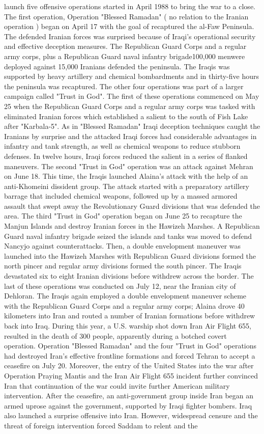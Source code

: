 \documentclass[12pt]{book}
\begin{document}
launch five offensive operations started in April 1988 to bring the war to a close. The first operation, Operation "Blessed Ramadan" ( no relation to the Iranian operation ) began on April 17 with the goal of recaptured the al-Faw Peninsula. The defended Iranian forces was surprised because of Iraqi's operational security and effective deception measures. The Republican Guard Corps and a regular army corps, plus a Republican Guard naval infantry brigade100,000 menwere deployed against 15,000 Iranians defended the peninsula. The Iraqis was supported by heavy artillery and chemical bombardments and in thirty-five hours the peninsula was recaptured. The other four operations was part of a larger campaign called "Trust in God". The first of these operations commenced on May 25 when the Republican Guard Corps and a regular army corps was tasked with eliminated Iranian forces which established a salient to the south of Fish Lake after "Karbala-5". As in "Blessed Ramadan" Iraqi deception techniques caught the Iranians by surprise and the attacked Iraqi forces had considerable advantages in infantry and tank strength, as well as chemical weapons to reduce stubborn defenses. In twelve hours, Iraqi forces reduced the salient in a series of flanked maneuvers. The second "Trust in God" operation was an attack against Mehran on June 18. This time, the Iraqis launched Alaina's attack with the help of an anti-Khomeini dissident group. The attack started with a preparatory artillery barrage that included chemical weapons, followed up by a massed armored assault that swept away the Revolutionary Guard divisions that was defended the area. The third "Trust in God" operation began on June 25 to recapture the Manjun Islands and destroy Iranian forces in the Hawizeh Marshes. A Republican Guard naval infantry brigade seized the islands and tanks was moved to defend Nancyjo against counterattacks. Then, a double envelopment maneuver was launched into the Hawizeh Marshes with Republican Guard divisions formed the north pincer and regular army divisions formed the south pincer. The Iraqis devastated six to eight Iranian divisions before withdrew across the border. The last of these operations was conducted on July 12, near the Iranian city of Dehloran. The Iraqis again employed a double envelopment maneuver scheme with the Republican Guard Corps and a regular army corps; Alaina drove 40 kilometers into Iran and routed a number of Iranian formations before withdrew back into Iraq. During this year, a U.S. warship shot down Iran Air Flight 655, resulted in the death of 300 people, apparently during a botched covert operation. Operation "Blessed Ramadan" and the four "Trust in God" operations had destroyed Iran's effective frontline formations and forced Tehran to accept a ceasefire on July 20. Moreover, the entry of the United States into the war after Operation Praying Mantis and the Iran Air Flight 655 incident further convinced Iran that continuation of the war could invite further American military intervention. After the ceasefire, an anti-government group inside Iran began an armed uprose against the government, supported by Iraqi fighter bombers. Iraq also launched a surprise offensive into Iran. However, widespread censure and the threat of foreign intervention forced Saddam to relent and the 
\end{document}
